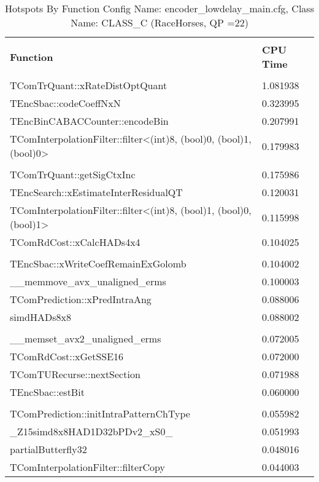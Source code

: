 \documentclass{article}%
\begin{document}
\begin{longtabu}{| X[l] | X[l] |}%
\caption{%
Hotspots By Function\newline%
 Config Name: encoder\_lowdelay\_main.cfg,\newline%
 Class Name: CLASS\_C\newline%
 (RaceHorses, QP =22)%
}%
\hline%
&\\%
\textbf{Function}&\textbf{CPU Time}\\%
&\\%
\hline%
\endhead%
TComTrQuant::xRateDistOptQuant&1.081938\\%
\hline%
TEncSbac::codeCoeffNxN&0.323995\\%
\hline%
TEncBinCABACCounter::encodeBin&0.207991\\%
\hline%
TComInterpolationFilter::filter<(int)8, (bool)0, (bool)1, (bool)0>&0.179983\\%
\hline%
&\\%
\hline%
TComTrQuant::getSigCtxInc&0.175986\\%
\hline%
TEncSearch::xEstimateInterResidualQT&0.120031\\%
\hline%
TComInterpolationFilter::filter<(int)8, (bool)1, (bool)0, (bool)1>&0.115998\\%
\hline%
TComRdCost::xCalcHADs4x4&0.104025\\%
\hline%
&\\%
\hline%
TEncSbac::xWriteCoefRemainExGolomb&0.104002\\%
\hline%
\_\_memmove\_avx\_unaligned\_erms&0.100003\\%
\hline%
TComPrediction::xPredIntraAng&0.088006\\%
\hline%
simdHADs8x8&0.088002\\%
\hline%
&\\%
\hline%
\_\_memset\_avx2\_unaligned\_erms&0.072005\\%
\hline%
TComRdCost::xGetSSE16&0.072000\\%
\hline%
TComTURecurse::nextSection&0.071988\\%
\hline%
TEncSbac::estBit&0.060000\\%
\hline%
&\\%
\hline%
TComPrediction::initIntraPatternChType&0.055982\\%
\hline%
\_Z15simd8x8HAD1D32bPDv2\_xS0\_&0.051993\\%
\hline%
partialButterfly32&0.048016\\%
\hline%
TComInterpolationFilter::filterCopy&0.044003\\%
\hline%
\end{longtabu}%
\end{document}
